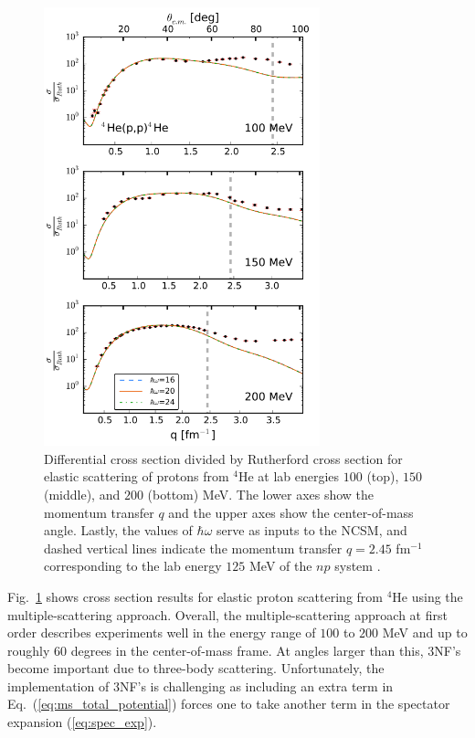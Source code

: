 \documentclass[preprintnumbers,floatfix,aps,prc,preprint,nofootinbib]{revtex4-1}
\begin{document}
%
\begin{figure}
	\captionsetup{singlelinecheck=false,justification=raggedright}
	\centering
	\includegraphics[width=8cm]{burrows_figure}
	\caption{Differential cross section divided by Rutherford cross section for elastic scattering of protons from $^{4}$He at lab energies $100$ (top), $150$ (middle), and $200$ (bottom) MeV. The lower axes show the momentum transfer $q$ and the upper axes show the center-of-mass angle. Lastly, the values of $\hbar \omega$ serve as inputs to the NCSM, and dashed vertical lines indicate the momentum transfer $q = 2.45$ fm$^{-1}$ corresponding to the lab energy $125$ MeV of the $np$ system \cite{Burrows:2018ggt}.}
	\label{fig:burrows_figure}
\end{figure}
%

Fig.~\ref{fig:burrows_figure} shows cross section results for elastic proton scattering from $^{4}$He using the multiple-scattering approach. Overall, the multiple-scattering approach at first order describes experiments well in the energy range of $100$ to $200$ MeV and up to roughly $60$ degrees in the center-of-mass frame. At angles larger than this, 3NF's become important due to three-body scattering. Unfortunately, the implementation of 3NF's is challenging as including an extra term in Eq.~(\ref{eq:ms_total_potential}) forces one to take another term in the spectator expansion (\ref{eq:spec_exp}).
		
\end{document}
